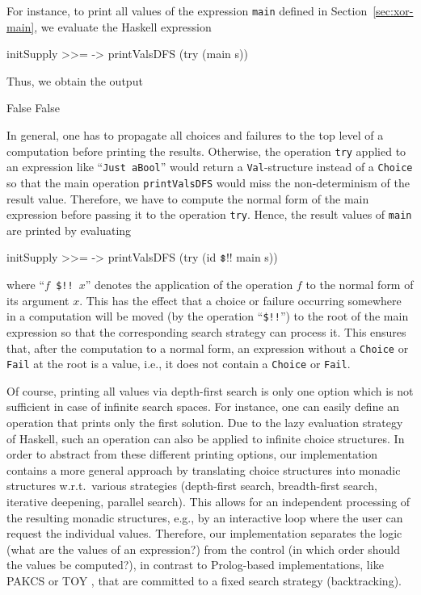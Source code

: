 \documentclass{llncs}
\newcommand{\code}[1]{\mbox{\small\texttt{#1}}}
\newcommand{\ccode}[1]{``\code{#1}''}
\newcommand{\dollar}{\code{\char36}} %
\begin{document}
For instance, to print all values of the expression \code{main}
defined in Section~\ref{sec:xor-main},
we evaluate the Haskell expression
\begin{haskell}
  initSupply >>= \s -> printValsDFS (try (main s))
\end{haskell}
Thus, we obtain the output
\begin{haskell}
  False
  False
\end{haskell}
In general, one has to propagate all choices and failures to the top level
of a computation before printing the results.
Otherwise, the operation \code{try} applied to an expression
like \ccode{Just aBool} would return a \code{Val}-structure
instead of a \code{Choice}
so that the main operation \code{printValsDFS} would miss
the non-determinism of the result value.
Therefore, we have to compute the normal form of the main
expression before passing it to the operation \code{try}.
Hence, the result values of \code{main} are printed by evaluating
\begin{haskell}
  initSupply >>= \s -> printValsDFS (try (id $\dollar$!! main s))
\end{haskell}
where \ccode{$f$ \$!! $x$} %
denotes the application of the operation $f$ to the normal form
of its argument $x$.
This has the effect that a choice or failure occurring somewhere in
a computation will be moved (by the operation \ccode{\$!!})
to the root of the main expression
so that the corresponding search strategy can process it.
This ensures that, after the computation to a normal form,
an expression without a \code{Choice} or \code{Fail} at the root
is a value, i.e., it does not contain a \code{Choice} or \code{Fail}.

Of course, printing all values via depth-first search
is only one option which is not sufficient in case of infinite search
spaces. For instance, one can easily define an operation
that prints only the first solution. Due to the lazy evaluation
strategy of Haskell, such an operation can also be applied to
infinite choice structures.
In order to abstract from these different printing options,
our implementation contains a more general
approach by translating choice structures into monadic structures
w.r.t.\ various strategies (depth-first search, breadth-first search,
iterative deepening, parallel search).
This allows for an independent processing of the resulting monadic structures,
e.g.,
by an interactive loop where the user can request the individual values.
Therefore, our implementation separates the logic
(what are the values of an expression?) from the control
(in which order should the values be computed?),
in contrast to Prolog-based implementations,
like PAKCS \cite{Hanus10PAKCS} or TOY \cite{Lopez-FraguasSanchez-Hernandez99},
that are committed to a fixed search strategy (backtracking).
\end{document}
